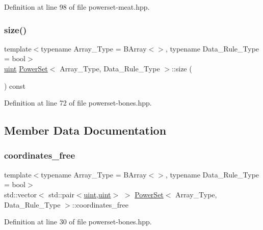 Definition at line 98 of file powerset-\/meat.\+hpp.

\mbox{\label{class_power_set_a80e7099e115369326e6c873a92d270f9}} 
\subsubsection{\texorpdfstring{size()}{size()}}
{\footnotesize\ttfamily template$<$typename Array\+\_\+\+Type  = B\+Array$<$$>$, typename Data\+\_\+\+Rule\+\_\+\+Type  = bool$>$ \\
\hyperlink{typedefs_8hpp_a91ad9478d81a7aaf2593e8d9c3d06a14}{uint} \hyperlink{class_power_set}{Power\+Set}$<$ Array\+\_\+\+Type, Data\+\_\+\+Rule\+\_\+\+Type $>$\+::size (\begin{DoxyParamCaption}{ }\end{DoxyParamCaption}) const\hspace{0.3cm}{\ttfamily [inline]}}



Definition at line 72 of file powerset-\/bones.\+hpp.



\subsection{Member Data Documentation}
\mbox{\label{class_power_set_a99cfef97c3a457ea7be1b000b39f41d9}} 
\subsubsection{\texorpdfstring{coordinates\+\_\+free}{coordinates\_free}}
{\footnotesize\ttfamily template$<$typename Array\+\_\+\+Type  = B\+Array$<$$>$, typename Data\+\_\+\+Rule\+\_\+\+Type  = bool$>$ \\
std\+::vector$<$ std\+::pair$<$\hyperlink{typedefs_8hpp_a91ad9478d81a7aaf2593e8d9c3d06a14}{uint},\hyperlink{typedefs_8hpp_a91ad9478d81a7aaf2593e8d9c3d06a14}{uint}$>$ $>$ \hyperlink{class_power_set}{Power\+Set}$<$ Array\+\_\+\+Type, Data\+\_\+\+Rule\+\_\+\+Type $>$\+::coordinates\+\_\+free}



Definition at line 30 of file powerset-\/bones.\+hpp.

